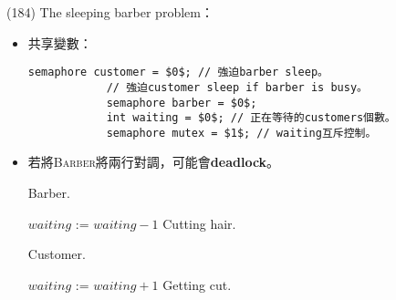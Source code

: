 \begin{theorem}{(184)} The sleeping barber problem：\begin{itemize}
        \item 共享變數：\begin{lstlisting}[caption={Shared variables of The sleeping barber problem.}, captionpos=b, mathescape=true]
            semaphore customer = $0$; // 強迫barber sleep。
            // 強迫customer sleep if barber is busy。
            semaphore barber = $0$; 
            int waiting = $0$; // 正在等待的customers個數。
            semaphore mutex = $1$; // waiting互斥控制。
        \end{lstlisting}
        \item 若將\textsc{Barber}將兩行對調，可能會\textbf{deadlock}。
        \begin{algorithm}[H]
            \caption{Barber.}
            \begin{algorithmic}[1]
                    \Repeat
                        \State {} 
                        \State {}
                        \State $waiting$ := $waiting - 1$
                        \State {} 
                        \State {}
                        \State Cutting hair.
                \EndFunction
            \end{algorithmic}
        \end{algorithm}
        \begin{algorithm}[H]
            \caption{Customer.}
            \begin{algorithmic}[1]
                    \Repeat
                        \State {}
                         
                            \State $waiting$ := $waiting + 1$
                            \State {}
                            \State {} 
                            \State {} 
                            \State Getting cut.
                        \Else
                            \State {}
                        \EndIf
                \EndFunction
            \end{algorithmic}
        \end{algorithm}
    \end{itemize}
\end{theorem}


